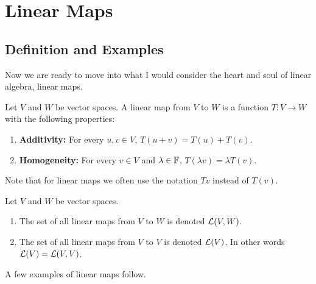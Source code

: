 \chapter{Linear Maps}
\section{Definition and Examples}
Now we are ready to move into what I would consider the heart and soul of linear algebra, linear maps.
\begin{definition}
    Let $V$ and $W$ be vector spaces. A linear map from $V$ to $W$ is a function $T: V\to W$ with the following properties:
    \begin{enumerate}
        \item \textbf{Additivity:}  For every $u,v\in V$, $T(u + v) = T(u) +T(v)$.
        \item \textbf{Homogeneity:} For every $v\in V$ and $\lambda \in \mathbb F$, $T(\lambda v) = \lambda T(v)$.
    \end{enumerate}
\end{definition}
Note that for linear maps we often use the notation $Tv$ instead of $T(v)$.
\begin{definition}
    Let $V$ and $W$ be vector spaces.
    \begin{enumerate}
        \item The set of all linear maps from $V$ to $W$ is denoted $\mathcal{L}(V,W)$.
        \item The set of all linear maps from $V$ to $V$ is denoted $\mathcal{L}(V)$. In other words $\mathcal{L}(V) = \mathcal{L}(V,V)$.
    \end{enumerate}
\end{definition}
A few examples of linear maps follow.
